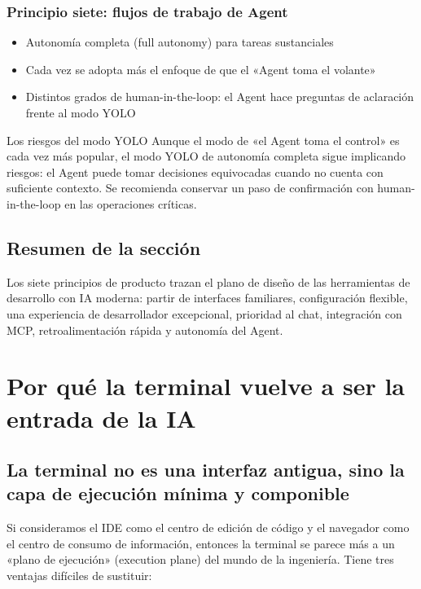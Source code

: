 \documentclass[a4paper]{article}
\begin{document}
\subsubsection{Principio siete: flujos de trabajo de Agent}

\begin{itemize}
    \item Autonomía completa (full autonomy) para tareas sustanciales
    \item Cada vez se adopta más el enfoque de que el «Agent toma el volante»
    \item Distintos grados de human-in-the-loop: el Agent hace preguntas de aclaración frente al modo YOLO
\end{itemize}

\begin{warningbox}{Los riesgos del modo YOLO}
Aunque el modo de «el Agent toma el control» es cada vez más popular, el modo YOLO de autonomía completa sigue implicando riesgos: el Agent puede tomar decisiones equivocadas cuando no cuenta con suficiente contexto. Se recomienda conservar un paso de confirmación con human-in-the-loop en las operaciones críticas.
\end{warningbox}

\subsection{Resumen de la sección}

Los siete principios de producto trazan el plano de diseño de las herramientas de desarrollo con IA moderna: partir de interfaces familiares, configuración flexible, una experiencia de desarrollador excepcional, prioridad al chat, integración con MCP, retroalimentación rápida y autonomía del Agent.

\section{Por qué la terminal vuelve a ser la entrada de la IA}

\subsection{La terminal no es una interfaz antigua, sino la capa de ejecución mínima y componible}

Si consideramos el IDE como el centro de edición de código y el navegador como el centro de consumo de información, entonces la terminal se parece más a un «plano de ejecución» (execution plane) del mundo de la ingeniería. Tiene tres ventajas difíciles de sustituir:
\end{document}
